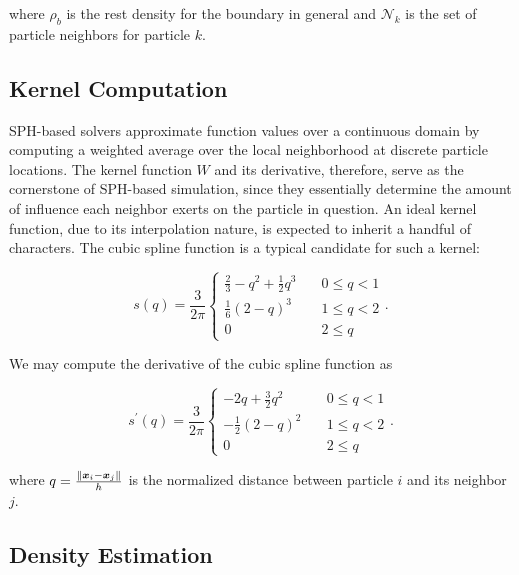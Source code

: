 \documentclass[
	11pt, 
	DIV10,
	ngerman,
	a4paper, 
	oneside, 
	headings=normal, 
	captions=tableheading,
	final, 
	numbers=noenddot
]{scrartcl}
\DeclarePairedDelimiter{\norm}{\lVert}{\rVert}
\begin{document}
where $ \rho_{b} $ is the rest density for the boundary in general and $ \mathcal{N}_{k} $ is the set of particle neighbors for particle $ k $.

\subsection{Kernel Computation}

SPH-based solvers approximate function values over a continuous domain by computing a weighted average over the local neighborhood at discrete particle locations. The kernel function $ W $ and its derivative, therefore, serve as the cornerstone of SPH-based simulation, since they essentially determine the amount of influence each neighbor exerts on the particle in question. An ideal kernel function, due to its interpolation nature, is expected to inherit a handful of characters. The cubic spline function is a typical candidate for such a kernel:

\begin{equation}
	\label{eq11}
	s\left(q\right) = \frac{3}{2\pi}\left\{
	\begin{array}{ll}
            \frac{2}{3} - q^{2} + \frac{1}{2}q^{3}	& \quad 0 \leq q < 1 \\[1em]
            \frac{1}{6}\left(2 - q\right)^{3}		& \quad 1 \leq q < 2 \\[1em]
            0	& \quad 2 \leq q
    \end{array}
    \right..
\end{equation}

We may compute the derivative of the cubic spline function as

\begin{equation}
	\label{eq12}
	s^{\prime}\left(q\right) = \frac{3}{2\pi}\left\{
	\begin{array}{ll}
            -2q + \frac{3}{2}q^{2}					& \quad 0 \leq q < 1 \\[1em]
            -\frac{1}{2}\left(2 - q\right)^{2}		& \quad 1 \leq q < 2 \\[1em]
            0	& \quad 2 \leq q
    \end{array}
    \right..
\end{equation}

where $ q = \frac{\norm{\boldsymbol{x}_{i} - \boldsymbol{x}_{j}}}{h} $ is the normalized distance between particle $ i $ and its neighbor $ j $.

\subsection{Density Estimation}
\end{document}
